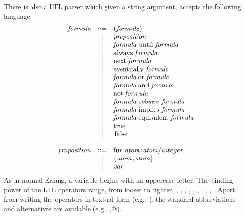 \documentclass[a4paper]{article}
\begin{document}
There is also a LTL parser which given a string argument, 
accepts the following language:
\[
\begin{array}{rcl}
\mathit{formula} & ::= & \mbox{\lstinline@(@} \mathit{formula} \mbox{\lstinline@)@} \\
     & | & \mathit{proposition} \\
     & | & \mathit{formula} \;\mbox{\lstinline@until@}\; \mathit{formula} \\
     & | & \mbox{\lstinline@always@}\; \mathit{formula} \\
     & | & \mbox{\lstinline@next@}\; \mathit{formula} \\
     & | & \mbox{\lstinline@eventually@}\; \mathit{formula} \\
     & | & \mathit{formula} \;\mbox{\lstinline@or@}\; \mathit{formula} \\
     & | & \mathit{formula} \;\mbox{\lstinline@and@}\; \mathit{formula} \\
     & | & \mbox{\lstinline@not@}\; \mathit{formula} \\
     & | & \mathit{formula} \;\mbox{\lstinline@release@}\; \mathit{formula} \\
     & | & \mathit{formula} \;\mbox{\lstinline@implies@}\; \mathit{formula} \\
     & | & \mathit{formula} \;\mbox{\lstinline@equivalent@}\; \mathit{formula}\\ 
     & | & \mbox{\lstinline@true@} \\
     & | & \mbox{\lstinline@false@}\\
\\
\mathit{proposition} & ::= & \mbox{\lstinline@fun@}\; \mathit{atom} \mbox{\lstinline@:@} \mathit{atom} \mbox{\lstinline@/@} integer\\
            & | &   \mbox{\lstinline@\{@} \mathit{atom} \mbox{\lstinline@,@} \mathit{atom} \mbox{\lstinline@\}@}\\
            & | &   \mathit{var}\\
\end{array}
\]
As in normal Erlang, a variable \lstinline@var@ begins with an uppercase
letter.
The binding power of the LTL operators range, from looser to tighter,
\lstinline@implies@, \lstinline@equivalent@, \lstinline@and@, \lstinline@or@, \lstinline@until@, \lstinline@release@, \lstinline@eventually@, \lstinline@always@,
\lstinline@next@, \lstinline@not@.
Apart from writing the operators in textual form (e.g., \lstinline@always@),
the standard abbreviations and alternatives are available
(e.g., \lstinline@G@,\lstinline@[]@).
\end{document}
